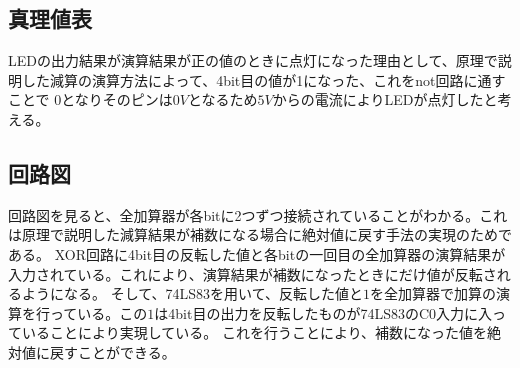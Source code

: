 \documentclass[a4paper,11pt]{ltjsarticle}
\begin{document}
\subsection{真理値表}
LEDの出力結果が演算結果が正の値のときに点灯になった理由として、原理で説明した減算の演算方法によって、4bit目の値が1になった、これをnot回路に通すことで
0となりそのピンは$0V$となるため$5V$からの電流によりLEDが点灯したと考える。
\subsection{回路図}
回路図を見ると、全加算器が各bitに2つずつ接続されていることがわかる。これは原理で説明した減算結果が補数になる場合に絶対値に戻す手法の実現のためである。
XOR回路に4bit目の反転した値と各bitの一回目の全加算器の演算結果が入力されている。これにより、演算結果が補数になったときにだけ値が反転されるようになる。
そして、74LS83を用いて、反転した値と$1$を全加算器で加算の演算を行っている。この$1$は4bit目の出力を反転したものが74LS83のC0入力に入っていることにより実現している。
これを行うことにより、補数になった値を絶対値に戻すことができる。
\end{document}
